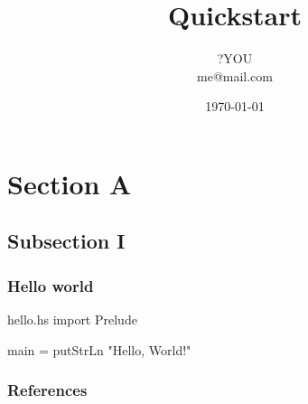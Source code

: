 \documentclass{beamer}
\title{Quickstart}
\author[?YOU]{?YOU \\ me@mail.com}
\date{\today}
\begin{document}


\section{Section A}
\subsection{Subsection I}


\begin{frame}[fragile]
  \frametitle{Hello world}
  \begin{Code}[Haskell]{hello.hs}
import Prelude

main = putStrLn "Hello, World!"
  \end{Code}
\end{frame}

\nocite{*}
\begin{frame}[allowframebreaks]
  \frametitle{References}
  \printbibliography
\end{frame}
\end{document}
